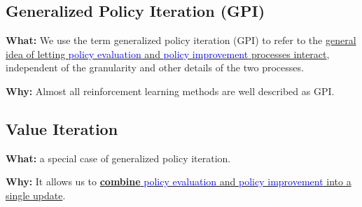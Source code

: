 \documentclass[12pt, a4paper]{article}
\begin{document}
\subsection{Generalized Policy Iteration (GPI)}\label{generalized-policy-iteration}

\textbf{What:} We use the term generalized policy iteration (GPI) to refer to the \uline{general idea of letting \textcolor{blue}{policy evaluation} and \textcolor{blue}{policy improvement} processes interact}, independent of the granularity and other details of the two processes.

\textbf{Why:} Almost all reinforcement learning methods are well described as GPI.


\subsection{Value Iteration}\label{value-iteration}

\textbf{What:} a special case of generalized policy iteration.

\textbf{Why:} It allows us to \uline{\textbf{combine} \textcolor{blue}{policy evaluation} and \textcolor{blue}{policy improvement} into a single update}.
\end{document}
